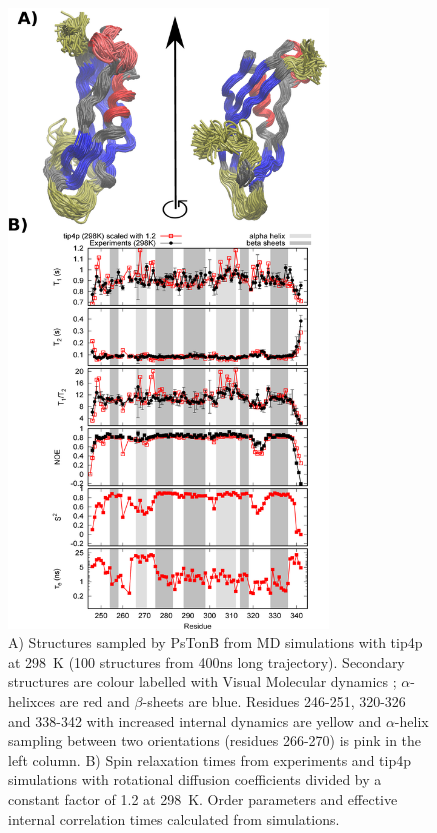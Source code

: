 \documentclass[pre,aps,floatfix,authordate1-4,twocolumn]{revtex4-1}
\begin{document}
\begin{figure}[!h]
  \includegraphics[width=8.5cm]{../Figs/RELdataPsTonB2.eps}%
  \caption{A) Structures sampled by PsTonB from MD simulations with tip4p at 298~K
    (100 structures from 400ns long trajectory). Secondary structures
    are colour labelled with Visual Molecular dynamics \cite{frishman95,humphrey96};
    $\alpha$-helixces are red and $\beta$-sheets are blue.
    Residues 246-251, 320-326 and 338-342 with increased internal dynamics are yellow and
    $\alpha$-helix sampling between two orientations (residues 266-270) is pink in the left column.
    B) Spin relaxation times from experiments and tip4p
    simulations with rotational diffusion coefficients divided by a
    constant factor of 1.2 at 298~K. Order parameters and effective internal correlation
    times calculated from simulations. \label{PsTonBrelaxationDATAscaled}}%
\end{figure}
\end{document}
